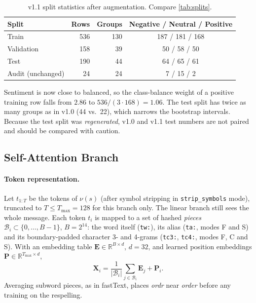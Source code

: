 \documentclass[11pt,a4paper]{article}
\theoremstyle{remark}
\newcommand{\lbl}[1]{\texttt{#1}}                      %
\newcommand{\hi}[1]{\textit{#1}}                       %
\newcommand{\R}{\mathbb{R}}
\begin{document}
\begin{table}[h]
\centering\small
\caption{v1.1 split statistics after augmentation. Compare \cref{tab:splits}.}
\label{tab:v11splits}
\begin{tabular}{@{}lrrc@{}}
\toprule
Split & Rows & Groups & Negative / Neutral / Positive \\
\midrule
Train      & 536 & 130 & 187 / 181 / 168 \\
Validation & 158 &  39 & \phantom{0}50 / \phantom{0}58 / \phantom{0}50 \\
Test       & 190 &  44 & \phantom{0}64 / \phantom{0}65 / \phantom{0}61 \\
\midrule
Audit (unchanged) & 24 & 24 & \phantom{00}7 / \phantom{0}15 / \phantom{00}2 \\
\bottomrule
\end{tabular}
\end{table}

Sentiment is now close to balanced, so the class-balance weight of a positive
training row falls from $2.86$ to $536/(3\cdot168)=1.06$. The test split has
twice as many groups as in v1.0 (44 vs.\ 22), which narrows the bootstrap
intervals. Because the test split was \emph{regenerated}, v1.0 and v1.1 test
numbers are not paired and should be compared with caution.

\subsection{Self-Attention Branch}
\label{sec:v11att}

\paragraph{Token representation.} Let $t_{1:T}$ be the tokens of
$\nu(s)$ (after symbol stripping in \lbl{strip\_symbols} mode), truncated to
$T\le T_{\max}=128$ for this branch only. The linear branch still sees the
whole message. Each token $t_i$ is mapped to a set of hashed \emph{pieces}
$\mathcal{B}_i\subset\{0,\dots,B-1\}$, $B=2^{14}$: the word itself
(\texttt{tw:}), its alias (\texttt{ta:}, modes F and S) and its boundary-padded
character 3- and 4-grams (\texttt{tc3:}, \texttt{tc4:}, modes F, C and S).
With an embedding table $\bm E\in\R^{B\times d}$, $d=32$, and learned position
embeddings $\bm P\in\R^{T_{\max}\times d}$,
\begin{equation}
  \bm X_i = \frac{1}{|\mathcal{B}_i|}\sum_{j\in\mathcal{B}_i}\bm E_j + \bm P_i.
  \label{eq:v11embed}
\end{equation}
Averaging subword pieces, as in fastText, places
\hi{ordr} near \hi{order} before any training on the respelling.
\end{document}
